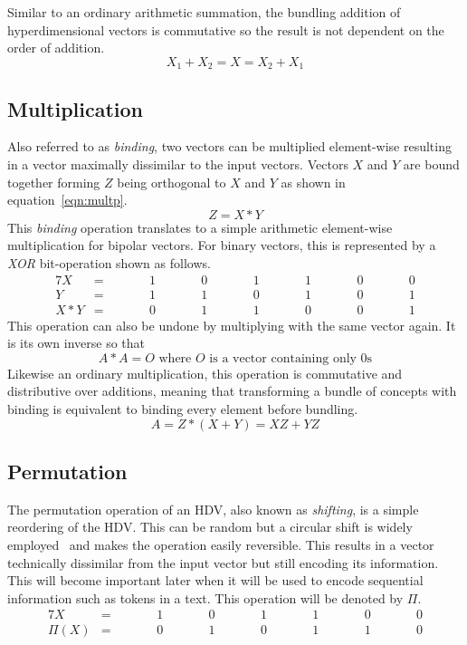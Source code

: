 Similar to an ordinary arithmetic summation, the bundling addition of hyperdimensional vectors is commutative so the result is not dependent on the order of addition.
\begin{equation}
    \label{eqn:sumcom}
    X_{1} + X_{2} = X = X_{2} + X_{1}
\end{equation}
\subsection*{Multiplication} \label{sssec:mult}
Also referred to as \textit{binding}, two vectors can be multiplied element-wise resulting in a vector maximally dissimilar to the input vectors. Vectors $X$ and $Y$ are bound together forming $Z$ being orthogonal to $X$ and $Y$ as shown in equation~\ref{eqn:multp}.
\begin{equation}
    \label{eqn:multp}
    Z = X * Y
\end{equation}
This \textit{binding} operation translates to a simple arithmetic element-wise multiplication for bipolar vectors. For binary vectors, this is represented by a \textit{XOR} bit-operation shown as follows.
\begin{alignat*}{7}
    X &= && \qquad 1 && \qquad 0 && \qquad 1 && \qquad 1 && \qquad 0 && \qquad 0 \\
    Y &= && \qquad 1 && \qquad 1 && \qquad 0 && \qquad 1 && \qquad 0 && \qquad 1 \\
    \hline
    X * Y &= && \qquad 0 && \qquad 1 && \qquad 1 &&  \qquad 0 && \qquad 0 && \qquad 1
\end{alignat*}
This operation can also be undone by multiplying with the same vector again. It is its own inverse so that
\begin{equation}
    \label{eqn:multpinv}
    A * A = O \text{ where $O$ is a vector containing only 0s}
\end{equation}
Likewise an ordinary multiplication, this operation is commutative and distributive over additions, meaning that transforming a bundle of concepts with binding is equivalent to binding every element before bundling.
\begin{equation}
    \label{eqn:multpdis}
    A = Z*(X + Y) = XZ + YZ
\end{equation}
\subsection*{Permutation} \label{sssec:perm}
The permutation operation of an HDV, also known as \textit{shifting}, is a simple reordering of the HDV. This can be random but a circular shift is widely employed~\cite{HD_rev} and makes the operation easily reversible. This results in a vector technically dissimilar from the input vector but still encoding its information. This will become important later when it will be used to encode sequential information such as tokens in a text. This operation will be denoted by $\Pi$.
\begin{alignat*}{7}
    X &= && \qquad 1 && \qquad 0 && \qquad 1 && \qquad 1 && \qquad 0 && \qquad 0 \\
    \hline
    \Pi(X) &= && \qquad 0 && \qquad 1 && \qquad 0 &&  \qquad 1 && \qquad 1 && \qquad 0
\end{alignat*}
